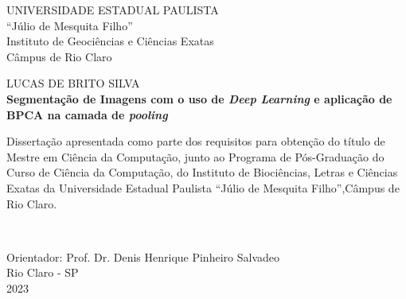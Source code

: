 \newpage
\thispagestyle{empty}

\begin{center}
    UNIVERSIDADE ESTADUAL PAULISTA\\
    “Júlio de Mesquita Filho”\\
    Instituto de Geociências e Ciências Exatas\\
    Câmpus de Rio Claro
    
    \vspace{2cm}
    {LUCAS DE BRITO SILVA\\}
    \vspace{2cm}
    \textbf{Segmentação de Imagens com o uso de \textit{Deep Learning} e aplicação de BPCA na camada de \textit{pooling}}
    
    \vspace{4cm}
    
    \hspace{.45\linewidth}
    \begin{minipage}{.50\linewidth}
    \small
        Dissertação apresentada como parte dos requisitos para obtenção do título de Mestre em Ciência da Computação, junto ao Programa de Pós-Graduação do Curso de Ciência da Computação, do Instituto de Biociências, Letras e Ciências Exatas da Universidade Estadual Paulista “Júlio de Mesquita Filho”,Câmpus de Rio Claro.
    \end{minipage} \\
    
    \vspace{1cm}

    Orientador: Prof. Dr. Denis Henrique Pinheiro Salvadeo\\
    
    \vfill
    \normalsize
    Rio Claro - SP \\
    2023
\end{center}